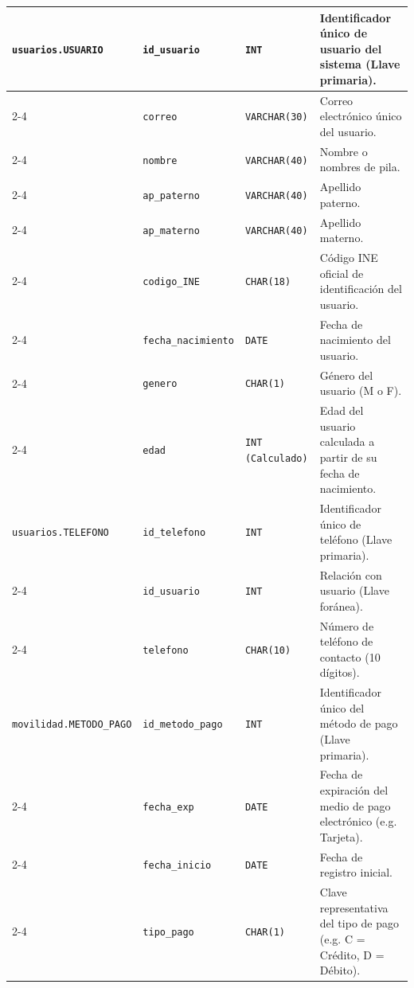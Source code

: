\begin{longtable}{|p{3.2cm}|p{2.7cm}|p{3.0cm}|p{6.0cm}|}
	\texttt{usuarios.USUARIO} & \texttt{id\_usuario} & \texttt{INT} & Identificador único de usuario del sistema (Llave primaria). \\ \cline{2-4}
	& \texttt{correo} & \texttt{VARCHAR(30)} & Correo electrónico único del usuario. \\ \cline{2-4}
	& \texttt{nombre} & \texttt{VARCHAR(40)} & Nombre o nombres de pila. \\ \cline{2-4}
	& \texttt{ap\_paterno} & \texttt{VARCHAR(40)} & Apellido paterno. \\ \cline{2-4}
	& \texttt{ap\_materno} & \texttt{VARCHAR(40)} & Apellido materno. \\ \cline{2-4}
	& \texttt{codigo\_INE} & \texttt{CHAR(18)} & Código INE oficial de identificación del usuario. \\ \cline{2-4}
	& \texttt{fecha\_nacimiento} & \texttt{DATE} & Fecha de nacimiento del usuario. \\ \cline{2-4}
	& \texttt{genero} & \texttt{CHAR(1)} & Género del usuario (M o F). \\ \cline{2-4}
	& \texttt{edad} & \texttt{INT (Calculado)} & Edad del usuario calculada a partir de su fecha de nacimiento. \\ \hline
	
	\texttt{usuarios.TELEFONO} & \texttt{id\_telefono} & \texttt{INT} & Identificador único de teléfono (Llave primaria). \\ \cline{2-4}
	& \texttt{id\_usuario} & \texttt{INT} & Relación con usuario (Llave foránea). \\ \cline{2-4}
	& \texttt{telefono} & \texttt{CHAR(10)} & Número de teléfono de contacto (10 dígitos). \\ \hline
	
	\texttt{movilidad.METODO\_PAGO} & \texttt{id\_metodo\_pago} & \texttt{INT} & Identificador único del método de pago (Llave primaria). \\ \cline{2-4}
	& \texttt{fecha\_exp} & \texttt{DATE} & Fecha de expiración del medio de pago electrónico (e.g. Tarjeta). \\ \cline{2-4}
	& \texttt{fecha\_inicio} & \texttt{DATE} & Fecha de registro inicial. \\ \cline{2-4}
	& \texttt{tipo\_pago} & \texttt{CHAR(1)} & Clave representativa del tipo de pago (e.g. C = Crédito, D = Débito). \\ \hline
	

\end{longtable}
